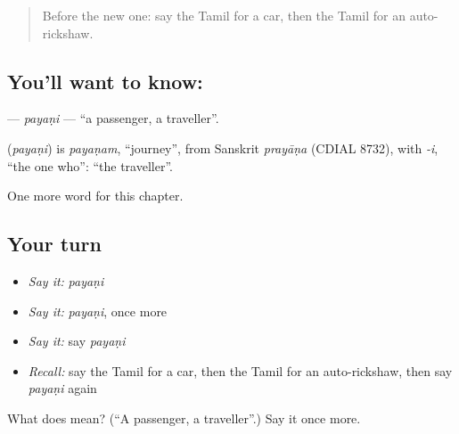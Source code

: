 \label{lesson:TA-C174-payani}



\begin{quote}
Before the new one: say the Tamil for a car, then the Tamil for an auto-rickshaw.
\end{quote}

\subsection*{You'll want to know: }
\textbf{} — \emph{payaṇi} — \textquotedblleft{}a passenger, a traveller\textquotedblright{}.

\begin{cousinweb}
\textbf{} (\emph{payaṇi}) is \emph{payaṇam}, \textquotedblleft{}journey\textquotedblright{}, from Sanskrit \emph{prayāṇa} (CDIAL 8732), with \emph{-i}, \textquotedblleft{}the one who\textquotedblright{}: \textquotedblleft{}the traveller\textquotedblright{}.
\end{cousinweb}

\begin{grammarlens}[title={What you've built}]
One more word for this chapter.
\end{grammarlens}

\subsection*{Your turn}
\begin{itemize}
\raggedright
  \item \emph{Say it:} \emph{payaṇi}
  \item \emph{Say it:} \emph{payaṇi}, once more
  \item \emph{Say it:} say \emph{payaṇi}
  \item \emph{Recall:} say the Tamil for a car, then the Tamil for an auto-rickshaw, then say \emph{payaṇi} again
\end{itemize}

\begin{tcolorbox}[breakable,colback=teal!4,colframe=teal!35!black,title={Before you move on}]
What does  mean? (\textquotedblleft{}A passenger, a traveller\textquotedblright{}.) Say it once more.
\end{tcolorbox}
